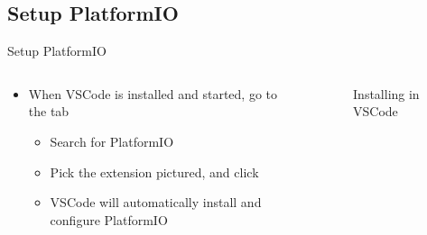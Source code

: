 \documentclass[aspectratio=169]{beamer}
\begin{document}
\subsection{Setup PlatformIO}
\begin{frame}{Setup PlatformIO}
\begin{columns}
	\begin{column}{0.5\textwidth}
		\begin{textBox}
			\begin{itemize}
				\item When VSCode is installed and started, go to the  tab
				\begin{itemize}
					\item Search for PlatformIO
					\item Pick the extension pictured, and click 
					\item VSCode will automatically install and configure PlatformIO
				\end{itemize}
			\end{itemize}
		\end{textBox}
	\end{column}
	\begin{column}{0.5\textwidth}
		\begin{figure}
  			\caption{Installing  in VSCode}
  			\label{fig:pio-dl}
		\end{figure}
	\end{column}
\end{columns}
\end{frame}
\end{document}
